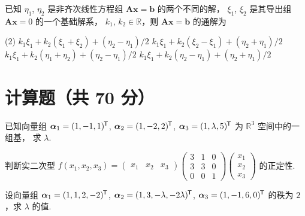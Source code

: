 \documentclass[fontset = fandol]{ctexart}
\newcommand*\mat[1]{\mathbf{#1}}
\newcommand*\trans[1]{#1^{\mkern-1.5mu\mathsf{T}}}
\begin{document}
\begin{problem}
  已知 $\eta_1$, $\eta_2$ 是非齐次线性方程组 $\mat A\bm x = \bm b$ 的两个不同的解，
  $\xi_1$, $\xi_2$ 是其导出组 $\mat A\bm x = 0$ 的一个基础解系，
  $k_1$, $k_2 \in \mathbb R$，则 $\mat A\bm x = \bm b$ 的通解为
  \begin{tasks}(2)
    \task $k_1\xi_1 + k_2(\xi_1 + \xi_2) + (\eta_2 - \eta_1)/2$
    \task $k_1\xi_1 + k_2(\xi_2 - \xi_1) + (\eta_2 + \eta_1)/2$
    \task $k_1\xi_1 + k_2(\eta_1 + \eta_2) + (\eta_2 - \eta_1)/2$
    \task $k_1\xi_1 + k_2(\eta_2 - \eta_1) + (\eta_2 + \eta_1)/2$
  \end{tasks}
\end{problem}
\begin{solution}
  
\end{solution}

\section{计算题（共 70 分）}

\begin{problem}
  已知向量组 $\bm\alpha_1 = \trans{(1,-1,1)}$, $\bm\alpha_2 = \trans{(1,-2,2)}$,
  $\bm\alpha_3 = \trans{(1,\lambda,5)}$ 为 $\mathbb R^3$ 空间中的一组基，
  求 $\lambda$.
\end{problem}
\begin{solution}
  
\end{solution}

\begin{problem}
  判断实二次型 $f(x_1,x_2,x_3) =
  \begin{pmatrix}
    x_1 & x_2 & x_3
  \end{pmatrix}
  \begin{pmatrix}
    3 & 1 & 0\\
    3 & 3 & 0\\
    0 & 0 & 1
  \end{pmatrix}
  \begin{pmatrix*}
    x_1\\ x_2\\ x_3
  \end{pmatrix*}$ 的正定性.
\end{problem}
\begin{solution}
  
\end{solution}

\begin{problem}
  设向量组 $\bm\alpha_1 = \trans{(1,1,2,-2)}$,
  $\bm\alpha_2 = \trans{(1,3,-\lambda,-2\lambda)}$,
  $\bm\alpha_3 = \trans{(1,-1,6,0)}$ 的秩为 $2$，求 $\lambda$ 的值.
\end{problem}
\begin{solution}
  
\end{solution}
\end{document}
